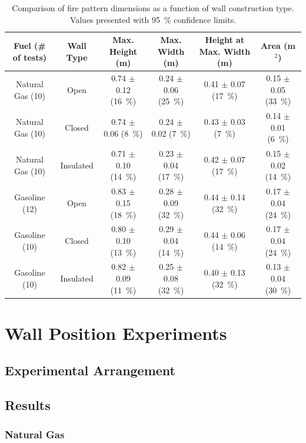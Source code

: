 \documentclass[twoside]{uocthesis}
\begin{document}
{{\begin{table}
	\centering
	\begin{tabular}{|c|c|c|c|c|c|}
	\hline
	Fuel (\# of tests)      &   Wall Type   &   Max. Height (m)	         & Max. Width (m)               &  Height at Max. Width (m) &  Area (m $^2$)  \\ \hline
		Natural Gas (10)    &   Open 		& 0.74 	$\pm$ 0.12 (16~\%)   &	0.24 $\pm$ 0.06 (25~\%) 	& 0.41 $\pm$ 0.07 (17~\%)	& 0.15 $\pm$ 0.05 (33~\%) 	\\
		Natural Gas (10)    &   Closed 		& 0.74	$\pm$ 0.06 (8~\%)    &	0.24 $\pm$ 0.02 (7~\%) 		& 0.43 $\pm$ 0.03 (7~\%)  	& 0.14 $\pm$ 0.01 (6~\%) 	\\
		Natural Gas (10)    &   Insulated 	& 0.71	$\pm$ 0.10 (14~\%)   &	0.23 $\pm$ 0.04 (17~\%) 	& 0.42 $\pm$ 0.07 (17~\%) 	& 0.15 $\pm$ 0.02 (14~\%)  	\\
		Gasoline (12)       &   Open    	& 0.83	$\pm$ 0.15 (18~\%)   &	0.28 $\pm$ 0.09 (32~\%) 	& 0.44 $\pm$ 0.14 (32~\%) 	& 0.17 $\pm$ 0.04 (24~\%)  	\\
		Gasoline (10)       &   Closed  	& 0.80	$\pm$ 0.10 (13~\%)   &	0.29 $\pm$ 0.04 (14~\%) 	& 0.44 $\pm$ 0.06 (14~\%) 	& 0.17 $\pm$ 0.04 (24~\%)  	\\
		Gasoline (10)       &   Insulated	& 0.82 	$\pm$ 0.09 (11~\%)   &	0.25 $\pm$ 0.08 (32~\%) 	& 0.40 $\pm$ 0.13 (32~\%) 	& 0.13 $\pm$ 0.04 (30~\%)  	\\
		\hline
	\end{tabular}
	\caption[Comparison of fire pattern dimensions as a function of wall construction type]{Comparison of fire pattern dimensions as a function of wall construction type. Values presented with 95~\% confidence limits.}
	\label{tab:Fire_Pattern_Dimensions_Wall_Construction}
\end{table}


\section{Wall Position Experiments}
\subsection{Experimental Arrangement}

\subsection{Results}

\subsubsection{Natural Gas}
}}
\end{document}
